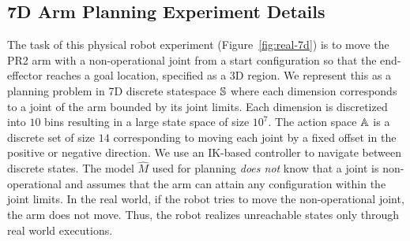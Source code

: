 \subsection{7D Arm Planning Experiment Details}
\label{sec:7d-arm-planning}

The task of this physical robot experiment (Figure~\ref{fig:real-7d}) is
to move the PR2 arm with a
non-operational joint from a start configuration so that the
end-effector reaches a goal location, specified as a 3D
region. We represent this as a planning problem in 7D
discrete statespace $\mathbb{S}$ where each dimension corresponds to
a joint of the arm bounded by its joint limits. Each dimension is
discretized into $10$ bins resulting in a large state space of
size $10^7$. The action space
$\mathbb{A}$ is a discrete set of size
$14$ corresponding to moving each joint by a fixed offset in the
positive or negative direction. We use an IK-based controller to
navigate between discrete states. The model $\hat{M}$ used for
planning \textit{does not} know that a joint is non-operational and
assumes that the arm can attain any configuration within the joint
limits. In the real world, if the robot tries to move the
non-operational joint, the arm does not move. Thus, the robot realizes
unreachable states only through real world executions.

